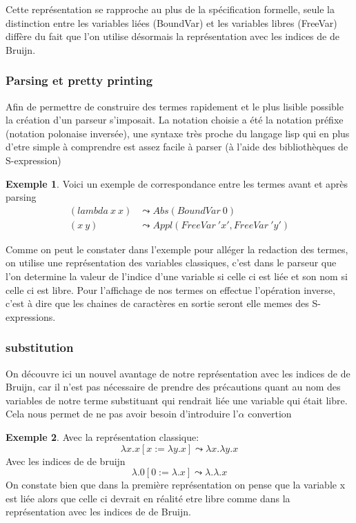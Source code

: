 \documentclass {article}
\newcommand{\codefrom}[3]
           {}
\theoremstyle{definition}
\newtheorem{example}{Exemple}
\theoremstyle{remark}
\begin{document}
\codefrom{untyped}{lambda}{untyped_term}

Cette représentation se rapproche au plus de la spécification formelle, seule la distinction entre les
variables liées (BoundVar) et les variables libres (FreeVar) diffère du fait que l'on utilise désormais 
la représentation avec les indices de de Bruijn.


\subsubsection{Parsing et pretty printing}
Afin de permettre de construire des termes rapidement et le plus lisible 
possible la création d'un parseur s'imposait.
La notation choisie a été la notation préfixe (notation polonaise inversée),
une syntaxe très proche du langage lisp qui en plus d'etre simple à comprendre
est assez facile à parser (à l'aide des bibliothèques de S-expression)
\begin{example}
  Voici un exemple de correspondance entre les termes avant et après parsing
  \begin{align*}
    (lambda\: x \: x) & \leadsto Abs(BoundVar\: 0) \\
    (x\: y) & \leadsto Appl(FreeVar\: 'x',FreeVar\: 'y')       
  \end{align*}
\end{example}

Comme on peut le constater dans l'exemple pour alléger la redaction des termes,
on utilise une représentation des variables classiques, c'est dans le parseur que 
l'on determine la valeur de l'indice d'une variable si celle ci est liée et son 
nom si celle ci est libre.
Pour l'affichage de nos termes on effectue l'opération inverse, c'est à dire que
les chaines de caractères en sortie seront elle memes des S-expressions.



\subsubsection{substitution}

On découvre ici un nouvel avantage de notre représentation avec les indices de
de Bruijn, car il n'est pas nécessaire de prendre des précautions quant au
nom des variables de notre terme substituant %
qui rendrait liée une variable qui était libre. Cela nous permet de ne pas 
avoir besoin d'introduire l'\(\alpha\) convertion

\begin{example}
  Avec la représentation classique: 
  \[ 
  \lambda x.x[x := \lambda y.x]\leadsto\lambda x.\lambda y.x
  \]
  Avec les indices de de bruijn
  \[ 
  \lambda.0[0 := \lambda.x]\leadsto\lambda.\lambda.x
  \]
  On constate bien que dans la première représentation on pense que la variable
  x est liée alors que celle ci devrait en réalité etre libre comme dans la 
  représentation avec les indices de de Bruijn.
\end{example}
\end{document}
